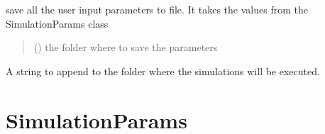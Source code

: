 \documentclass[letterpaper,10pt,english]{sphinxmanual}
\begin{document}
\begin{fulllineitems}
\begin{fulllineitems}
\end{fulllineitems}


\begin{fulllineitems}
\label{\detokenize{code_documentation:raypyng.simulate.Simulate.save_parameters_to_file}}
\pysigstartsignatures
{}
\pysigstopsignatures
\sphinxAtStartPar
save all the user input parameters to file. It takes the values
from the SimulationParams class
\begin{quote}\begin{description}
\sphinxAtStartPar
{} () \textendash{} the folder where to save the parameters

\end{description}\end{quote}

\end{fulllineitems}


\begin{fulllineitems}
\label{\detokenize{code_documentation:raypyng.simulate.Simulate.simulation_name}}
\pysigstartsignatures
{}
\pysigstopsignatures
\sphinxAtStartPar
A string to append to the folder where the simulations will be executed.

\end{fulllineitems}


\end{fulllineitems}



\section{SimulationParams}
\label{\detokenize{code_documentation:simulationparams}}
\end{document}
